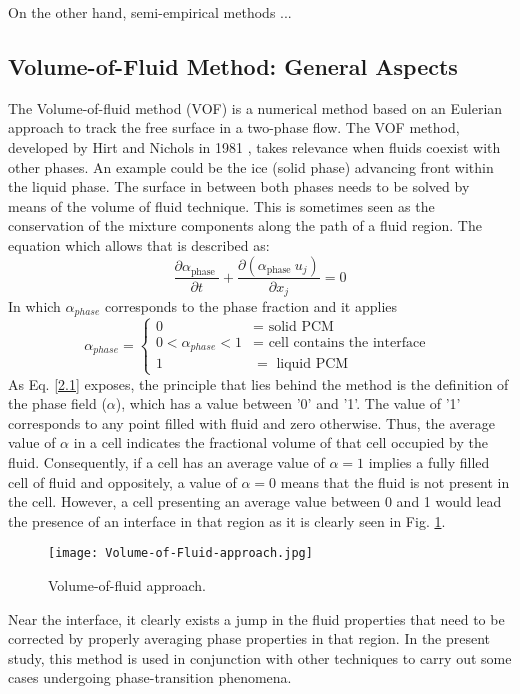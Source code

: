 On the other hand, semi-empirical methods ...
\subsection{Volume-of-Fluid Method: General Aspects}
The Volume-of-fluid method (VOF) is a numerical method based on an Eulerian approach to track the free surface in a two-phase flow.
The VOF method, developed by Hirt and Nichols in 1981 \cite{hirt_nichols_1981}, takes relevance when fluids coexist with other phases. An example could be the ice (solid phase) advancing front within the liquid phase. The surface in between both phases needs to be solved by means of the volume of fluid technique.
\newline
This is sometimes seen as the conservation of the mixture components along the path of a fluid region. The equation which allows that is described as:
\begin{equation}
	\frac{\partial \alpha_{\text {phase }}}{\partial t}+\frac{\partial\left(\alpha_{\text {phase }} u_{j}\right)}{\partial x_{j}}=0
	\label{2.1}
\end{equation}
In which $\alpha_{phase}$ corresponds to the phase fraction and it applies
\begin{equation}
	\alpha_{phase}= \begin{cases}
		0 & =\text { solid PCM } \\ 0<\alpha_{phase}<1 & =\text { cell contains the interface } \\ 1 & =\text { liquid } \mathrm{PCM}
	\end{cases}
	\label{2.2}
\end{equation}
\clearpage
As Eq. \ref{2.1} exposes, the principle that lies behind the method is the definition of the phase field ($\alpha$), which has a value between '0' and '1'. The value of '1' corresponds to any point filled with fluid and zero otherwise. Thus, the average value of $\alpha$	in a cell indicates the fractional volume of that cell occupied by the fluid. Consequently, if a cell has an average value of $\alpha=1$ implies a fully filled cell of fluid and oppositely, a value of $\alpha=0$ means that the fluid is not present in the cell. However, a cell presenting an average value between 0 and 1 would lead the presence of an interface in that region as it is clearly seen in Fig. \ref{2.1fig}.
\begin{figure}[h!]
	\centering
	\texttt{[image: Volume-of-Fluid-approach.jpg]}	
	\label{2.1fig}
	\caption{Volume-of-fluid approach.}
\end{figure} 
Near the interface, it clearly exists a jump in the fluid properties that need to be corrected by properly averaging phase properties in that region.
\newline
In the present study, this method is used in conjunction with other techniques to carry out some cases undergoing phase-transition phenomena.
